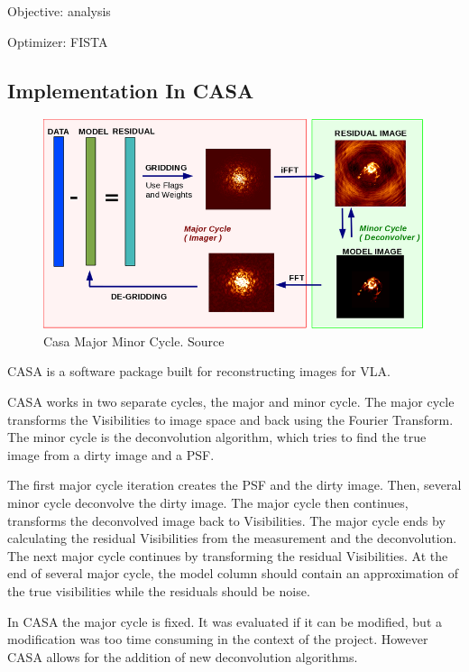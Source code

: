 Objective: analysis


Optimizer: FISTA

\pagebreak
\subsection{Implementation In CASA}

\begin{figure}
	\centering
	\vspace{-15pt}
	\includegraphics[width=0.9\linewidth]{./chapters/04.cs/img/casa_major_minor.png}
	\caption{Casa Major Minor Cycle. Source \cite{casa2018major}}
	\label{cs:major}
	\vspace{-10pt}
\end{figure}

CASA is a software package built for reconstructing images for VLA. 

CASA works in two separate cycles, the major and minor cycle. The major cycle transforms the Visibilities to image space and back using the Fourier Transform. The minor cycle is the deconvolution algorithm, which tries to find the true image from a dirty image and a PSF. 

The first major cycle iteration creates the PSF and the dirty image. Then, several minor cycle deconvolve the dirty image. The major cycle then continues, transforms the deconvolved image back to Visibilities. The major cycle ends by calculating the residual Visibilities from the measurement and the deconvolution. The next major cycle continues by transforming the residual Visibilities. At the end of several major cycle, the model column should contain an approximation of the true visibilities while the residuals should be noise. %

In CASA the major cycle is fixed. It was evaluated if it can be modified, but a modification was too time consuming in the context of the project. However CASA allows for the addition of new deconvolution algorithms. 

